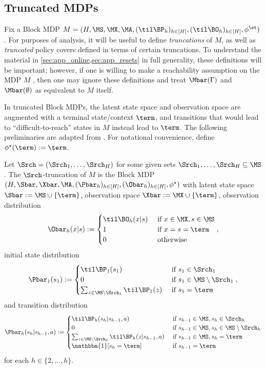 \subsection{Truncated MDPs}\label{sec:truncated-mdps}
Fix a Block MDP $M = (H, \MS, \MX, \MA, (\til \BP_h)_{h \in [H]}, (\til\BO_h)_{h\in[H]}, \phi^\st)$. For purposes of analysis, it will be useful to define \emph{truncations} of $M$, as well as \emph{truncated} policy covers defined in terms of certain truncations. To understand the material in \cref{sec:app_online,sec:app_resets} in full generality, these definitions will be important; however, if one is willing to make a reachability assumption on the MDP $M$ \citep{misra2020kinematic}, then one may ignore these definitions and treat $\Mbar(\Gamma)$ and $\Mbar(\emptyset)$ as equivalent to $M$ itself.

In truncated Block MDPs, the latent state space and observation space are augmented with a terminal state/context $\term$, and transitions that would lead to ``difficult-to-reach'' states in $M$ instead lead to $\term$. The following preliminaries are adapted from \cite{golowich2024exploring}. For notational convenience, define $\phi^\star(\term) := \term$. %

\begin{definition}\label{def:truncated-bmdp}
Let $\Srch = (\Srch_1,\dots,\Srch_H)$ for some given sets $\Srch_1,\dots,\Srch_H \subseteq \MS$. The $\Srch$-truncation of $M$ is the Block MDP $(H, \Sbar,\Xbar,\MA,(\Pbar_h)_{h\in[H]},(\Obar_h)_{h\in[H]},\phi^\star)$ with latent state space $\Sbar := \MS \cup \{\term\}$, observation space $\Xbar := \MX \cup \{\term\}$, observation distribution
\[\Obar_h(x|s) := \begin{cases} \til\BO_h(x|s) & \text{ if } x \in \MX, s \in \MS \\ 1 & \text{ if } x=s=\term \\ 0 & \text{ otherwise} \end{cases},\]
initial state distribution 
\[\Pbar_1(s_1) := \begin{cases}
\til\BP_1(s_1) & \text{ if } s_1 \in \Srch_1 \\ 
0 & \text{ if } s_1 \in \MS \setminus \Srch_1 \\ 
\sum_{z \in \MS \setminus \Srch_1} \til\BP_1(z) & \text{ if } s_1 = \term 
\end{cases},\]
and transition distribution
\[\Pbar_h(s_h|s_{h-1},a) := \begin{cases} \til\BP_h(s_h|s_{h-1},a) & \text{ if } s_{h-1} \in \MS, s_h \in \Srch_h \\ 0 & \text{ if } s_{h-1} \in \MS, s_h \in \MS\setminus\Srch_h \\ \sum_{z \in \MS\setminus\Srch_h} \til\BP_h(z|s_{h-1},a) &\text{ if } s_{h-1} \in \MS, s_h = \term \\ \mathbbm{1}[s_h=\term] & \text{ if } s_{h-1} = \term \end{cases} \]
for each $h \in \{2,\dots,h\}$.
\end{definition}

